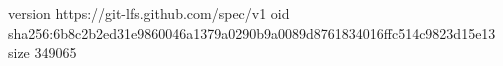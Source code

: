 version https://git-lfs.github.com/spec/v1
oid sha256:6b8c2b2ed31e9860046a1379a0290b9a0089d8761834016ffc514c9823d15e13
size 349065
